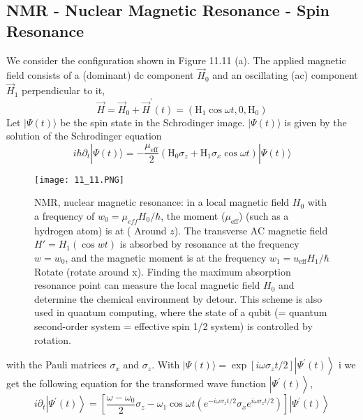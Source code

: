 \subsection{NMR - Nuclear Magnetic Resonance - Spin Resonance}
We consider the configuration shown in Figure 11.11 (a). The applied magnetic field consists of a (dominant) dc component $\vec{H}_0$ and an oscillating (ac) component $\vec{H}_1$ perpendicular to it,
\begin{equation}
    \vec{H}=\vec{H}_{0}+\vec{H}^{\prime}(t)=\left(\mathrm{H}_{1} \cos \omega t, 0, \mathrm{H}_{0}\right)
    \end{equation}
Let $|\Psi(t)\rangle$ be the spin state in the Schrodinger image. $|\Psi(t)\rangle$ is given by the solution of the Schrodinger equation
\begin{equation}
    i \hbar \partial_{t}|\Psi(t)\rangle=-\frac{\mu_{\mathrm{eff}}}{2}\left(\mathrm{H}_{0} \sigma_{z}+\mathrm{H}_{1} \sigma_{x} \cos \omega t\right)|\Psi(t)\rangle
    \end{equation}
\begin{figure}[ht]
        \centering
        \texttt{[image: 11\_11.PNG]}
        \caption{NMR, nuclear magnetic resonance: in a local magnetic field $ H_0 $ with a frequency of $ w_0 = \mu_ {eff} H_0 / \hbar $, the moment ($ \mu _ {\text {eff}} $) (such as a hydrogen atom) is at ( Around $ z $). The transverse AC magnetic field $ H '= H_1 (\operatorname {cos} wt) $ is absorbed by resonance at the frequency $ w = w_0 $, and the magnetic moment is at the frequency $ w_1 = u _ {\text {eff}} H_1 / \hbar $ Rotate (rotate around x). Finding the maximum absorption resonance point can measure the local magnetic field $ H_0 $ and determine the chemical environment by detour. This scheme is also used in quantum computing, where the state of a qubit (= quantum second-order system = effective spin 1/2 system) is controlled by rotation.}
\end{figure}
with the Pauli matrices $\sigma_x$ and $\sigma_z$. With $|\Psi(t)\rangle=\exp \left[i \omega \sigma_{z} t / 2\right]\left|\Psi^{\prime}(t)\right\rangle$ i we get the following equation for the transformed wave function $\left|\Psi^{\prime}(t)\right\rangle$,
\begin{equation}
    i \partial_{t}\left|\Psi^{\prime}(t)\right\rangle=\left[\frac{\omega-\omega_{0}}{2} \sigma_{z}-\omega_{1} \cos \omega t\left(e^{-i \omega \sigma_{z} t / 2} \sigma_{x} e^{i \omega \sigma_{z} t / 2}\right)\right]\left|\Psi^{\prime}(t)\right\rangle
    \end{equation}
